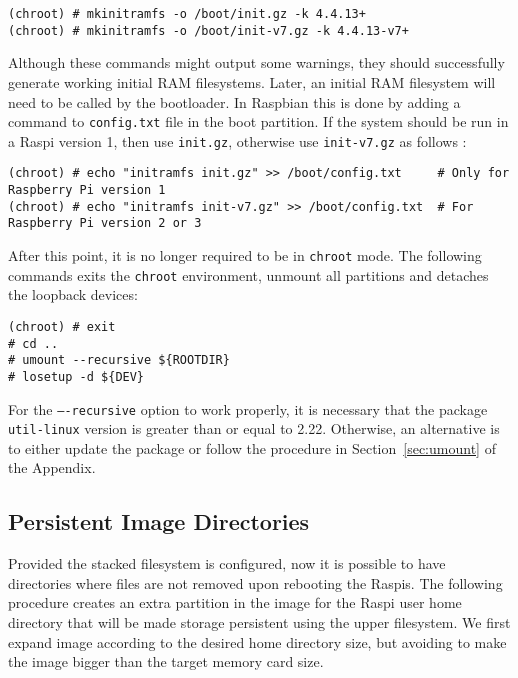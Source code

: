 \begin{lstlisting}[]
(chroot) # mkinitramfs -o /boot/init.gz -k 4.4.13+
(chroot) # mkinitramfs -o /boot/init-v7.gz -k 4.4.13-v7+
\end{lstlisting}
\FloatBarrier
\vspace{-5mm}

Although these commands might output some warnings, they should
successfully generate working initial \ac{RAM} filesystems. Later, an
initial \ac{RAM} filesystem will need to be called by the bootloader.
In Raspbian this is done by adding a command to \texttt{config.txt} file
in the boot partition. If the system should be run in a \ac{Raspi} version 1,
then use \texttt{init.gz}, otherwise use \texttt{init-v7.gz} as follows
:

\begin{lstlisting}[]
(chroot) # echo "initramfs init.gz" >> /boot/config.txt     # Only for Raspberry Pi version 1
(chroot) # echo "initramfs init-v7.gz" >> /boot/config.txt  # For Raspberry Pi version 2 or 3
\end{lstlisting}
\FloatBarrier
\vspace{-5mm}

After this point, it is no longer required to be in \texttt{chroot} mode.
The following commands exits the \texttt{chroot} environment, unmount all
partitions and detaches the loopback devices:

\begin{lstlisting}[]
(chroot) # exit
# cd ..
# umount --recursive ${ROOTDIR}
# losetup -d ${DEV}
\end{lstlisting}
\FloatBarrier
\vspace{-5mm}

For the \texttt{----recursive} option to work properly, it is necessary that
the package \texttt{util-linux} version is greater than or equal to 2.22.
Otherwise, an alternative is to either update the package or follow the
procedure in Section~\ref{sec:umount} of the Appendix.

\subsection{Persistent Image Directories}
\label{sec:persistent_directories}
Provided the stacked filesystem is configured, now it is possible to have
directories where files are not removed upon rebooting the \ac{Raspi}s.
The following procedure creates an extra partition in the image for
the \ac{Raspi} user home directory that will be made storage persistent
using the upper filesystem. We first expand image according to the desired
home directory size, but avoiding to make the image bigger than the target
memory card size.

